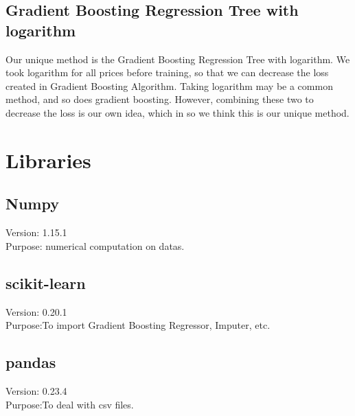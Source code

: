 \documentclass{article}
\begin{document}
\subsection{Gradient Boosting Regression Tree with logarithm}
Our unique method is the Gradient Boosting Regression Tree with logarithm. We took logarithm for all prices before training, so that we can decrease the loss created in Gradient Boosting Algorithm. Taking logarithm may be a common method, and so does gradient boosting. However, combining these two to decrease the loss is our own idea, which in so we think this is our unique method.

\section{Libraries}
\subsection{Numpy}
\noindent
Version: 1.15.1 \\
Purpose: numerical computation on datas.

\subsection{scikit-learn}
\noindent
Version: 0.20.1\\
Purpose:To import Gradient Boosting Regressor, Imputer, etc.

\subsection{pandas}
\noindent
Version: 0.23.4\\
Purpose:To deal with csv files.
\end{document}
